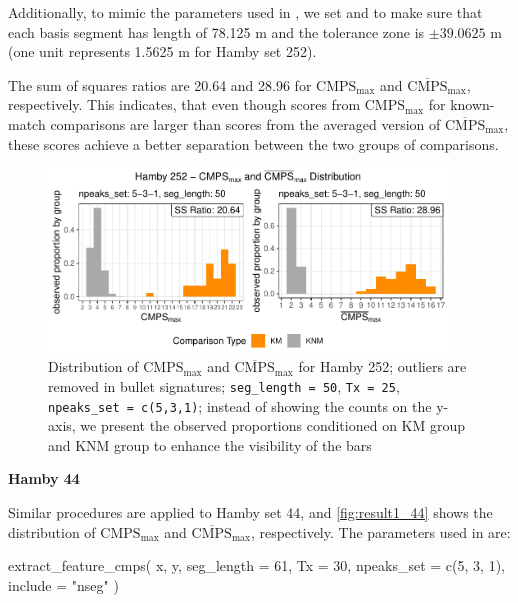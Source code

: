 Additionally, to mimic the parameters used in \citet{cmps}, we set
 and  to make sure that each basis
segment has length of 78.125 \textmu m and the tolerance zone is
\(\pm 39.0625\) \textmu m (one unit represents 1.5625 \textmu m for
Hamby set 252).

The sum of squares ratios are 20.64 and 28.96 for
\(\mathrm{CMPS_{max}}\) and \(\mathrm{\overline{CMPS}_{max}}\),
respectively. This indicates, that even though scores from
\(\mathrm{CMPS_{max}}\) for known-match comparisons are larger than
scores from the averaged version of \(\mathrm{\overline{CMPS}_{max}}\),
these scores achieve a better separation between the two groups of
comparisons.

\begin{Schunk}
\begin{figure}

{\centering \includegraphics[width=400px]{ju-hofmann_files/figure-latex/result1_252-1} 

}

\caption{Distribution of $\mathrm{CMPS_{max}}$ and $\mathrm{\overline{CMPS}_{max}}$ for Hamby 252; outliers are removed in bullet signatures; \texttt{seg\_length = 50}, \texttt{Tx = 25}, \texttt{npeaks\_set = c(5,3,1)}; instead of showing the counts on the y-axis, we present the observed proportions conditioned on KM group and KNM group to enhance the visibility of the bars }\label{fig:result1_252}
\end{figure}
\end{Schunk}

\textbf{Hamby 44}

Similar procedures are applied to Hamby set 44, and
\autoref{fig:result1_44} shows the distribution of
\(\mathrm{CMPS_{max}}\) and \(\mathrm{\overline{CMPS}_{max}}\),
respectively. The parameters used in  are:

\begin{Schunk}
\begin{Sinput}
extract_feature_cmps(
  x, y,
  seg_length = 61,
  Tx = 30,
  npeaks_set = c(5, 3, 1),
  include = "nseg"
)
\end{Sinput}
\end{Schunk}

